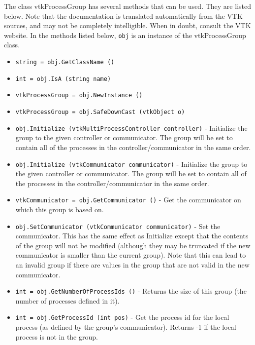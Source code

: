 The class vtkProcessGroup has several methods that can be used.
  They are listed below.
Note that the documentation is translated automatically from the VTK sources,
and may not be completely intelligible.  When in doubt, consult the VTK website.
In the methods listed below, \verb|obj| is an instance of the vtkProcessGroup class.
\begin{itemize}
\item  \verb|string = obj.GetClassName ()|

\item  \verb|int = obj.IsA (string name)|

\item  \verb|vtkProcessGroup = obj.NewInstance ()|

\item  \verb|vtkProcessGroup = obj.SafeDownCast (vtkObject o)|

\item  \verb|obj.Initialize (vtkMultiProcessController controller)| -  Initialize the group to the given controller or communicator.  The group
 will be set to contain all of the processes in the controller/communicator
 in the same order.

\item  \verb|obj.Initialize (vtkCommunicator communicator)| -  Initialize the group to the given controller or communicator.  The group
 will be set to contain all of the processes in the controller/communicator
 in the same order.

\item  \verb|vtkCommunicator = obj.GetCommunicator ()| -  Get the communicator on which this group is based on.

\item  \verb|obj.SetCommunicator (vtkCommunicator communicator)| -  Set the communicator.  This has the same effect as Initialize except that
 the contents of the group will not be modified (although they may be
 truncated if the new communicator is smaller than the current group).
 Note that this can lead to an invalid group if there are values in the
 group that are not valid in the new communicator.

\item  \verb|int = obj.GetNumberOfProcessIds ()| -  Returns the size of this group (the number of processes defined in it).

\item  \verb|int = obj.GetProcessId (int pos)| -  Get the process id for the local process (as defined by the group's
 communicator).  Returns -1 if the local process is not in the group.


\end{itemize}
